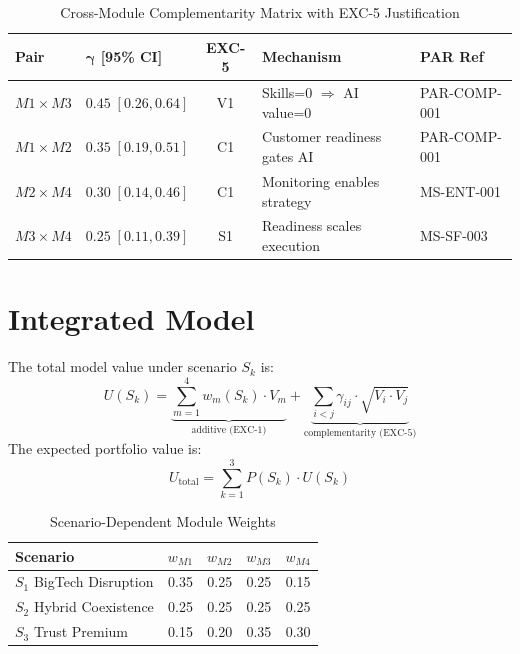 \begin{table}[htbp]
\centering
\caption{Cross-Module Complementarity Matrix with EXC-5 Justification}
\label{tab:aim-gamma-matrix}
\renewcommand{\arraystretch}{1.3}
\begin{tabular}{@{}llcll@{}}
\toprule
\textbf{Pair} & $\boldsymbol{\gamma}$ \textbf{[95\% CI]} & \textbf{EXC-5} & \textbf{Mechanism} & \textbf{PAR Ref} \\
\midrule
$M1 \times M3$ & $0.45 \; [0.26, 0.64]$ & V1 & Skills=0 $\Rightarrow$ AI value=0 & PAR-COMP-001 \\
$M1 \times M2$ & $0.35 \; [0.19, 0.51]$ & C1 & Customer readiness gates AI & PAR-COMP-001 \\
$M2 \times M4$ & $0.30 \; [0.14, 0.46]$ & C1 & Monitoring enables strategy & MS-ENT-001 \\
$M3 \times M4$ & $0.25 \; [0.11, 0.39]$ & S1 & Readiness scales execution & MS-SF-003 \\
\bottomrule
\end{tabular}
\end{table}


\section{Integrated Model}
\label{sec:aim-integrated}

\begin{definition}
\label{def:aim-portfolio}
The total model value under scenario $S_k$ is:
\begin{equation}
U(S_k) = \underbrace{\sum_{m=1}^{4} w_m(S_k) \cdot V_m}_{\text{additive (EXC-1)}}
+ \underbrace{\sum_{i < j} \gamma_{ij} \cdot \sqrt{V_i \cdot V_j}}_{\text{complementarity (EXC-5)}}
\label{eq:aim-total-value}
\end{equation}
The expected portfolio value is:
\begin{equation}
U_{\text{total}} = \sum_{k=1}^{3} P(S_k) \cdot U(S_k)
\label{eq:aim-expected-total}
\end{equation}
\end{definition}

\begin{table}[htbp]
\centering
\caption{Scenario-Dependent Module Weights}
\label{tab:aim-weights}
\renewcommand{\arraystretch}{1.3}
\begin{tabular}{@{}lcccc@{}}
\toprule
\textbf{Scenario} & $w_{M1}$ & $w_{M2}$ & $w_{M3}$ & $w_{M4}$ \\
\midrule
$S_1$ BigTech Disruption & 0.35 & 0.25 & 0.25 & 0.15 \\
$S_2$ Hybrid Coexistence & 0.25 & 0.25 & 0.25 & 0.25 \\
$S_3$ Trust Premium & 0.15 & 0.20 & 0.35 & 0.30 \\
\bottomrule
\end{tabular}
\end{table}

